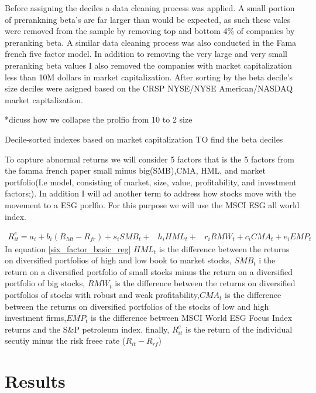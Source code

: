 \documentclass[12pt,oneside,reqno]{amsart}
\begin{document}
Before assigning the deciles a data cleaning process was applied. A small portion of prerankning beta's are far larger than would be expected, as such these vales were removed from the sample by removing top and bottom 4\% of companies by preranking beta. A similar data cleaning process was also conducted in the Fama french five factor model. In addition to removing the very large and very small preranking beta values I also removed the companies with market capitalization less than 10M dollars in market capitalization. After sorting by the beta decile's size deciles were asigned based on the CRSP NYSE/NYSE American/NASDAQ market capitalization.


*dicuss how we collapse the prolfio from 10 to 2 size

Decile-sorted indexes based on
market capitalization
TO find the beta deciles 


To capture abnormal returns we will consider 5 factors that is the 5 factors from the famma french paper small minus big(SMB),CMA, HML, and market portfolio(I.e model, consisting of market, size, value, profitability, and investment factors;). In addition I will ad another term to address how stocks move with the movement to a ESG porlfio. For this purpose we will use the MSCI ESG all world index. 

\begin{equation}
\begin{split}
    R_{it}^e = a_i+b_i(R_{Mt}-R_{fr})+s_iSMB_t+ & h_iHML_t+ & r_iRMW_t+c_iCMA_t+e_iEMP_t
    \end{split}
    \label{six_factor_basic_reg}
\end{equation}
In equation \eqref{six_factor_basic_reg} $HML_{t}$ is the difference between the returns on diversified portfolios of high and low book to market stocks, $SMB_{t}$ i the return on a diversified portfolio of small stocks minus the return on a diversified portfolio of big stocks, $RMW_t$ is the difference between the returns on diversified portfolios of stocks with robust and weak profitability,$CMA_{t}$ is the difference between the returns on diversified portfolios of the stocks of low and high investment firms,$EMP_t$ is the difference between MSCI World ESG Focus Index returns and the S\&P petroleum index. finally, $R^e_{it}$ is the return of the individual secutiy minus the risk freee rate ($R_{it}-R_{rf}$)


\section{Results}
\label{Results}
\end{document}
